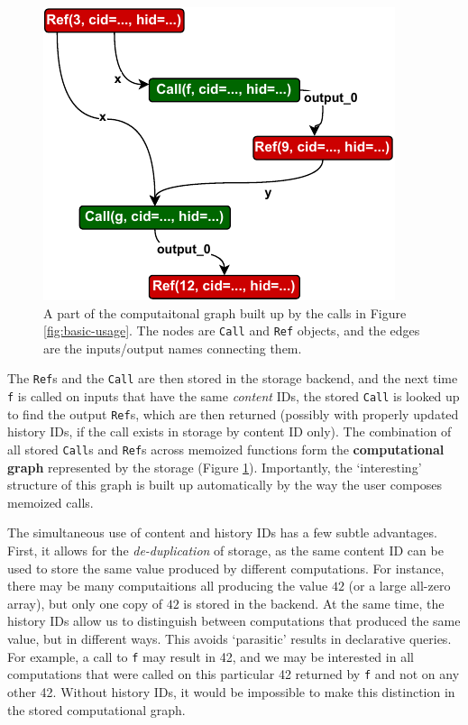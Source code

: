 \documentclass{article} %
\begin{document}
\begin{figure}
    \centering
    \includegraphics[width=\linewidth]{img/comp-graph.pdf}
    \caption{A part of the computaitonal graph built up by the calls in Figure
    \ref{fig:basic-usage}. The nodes are \texttt{Call} and \texttt{Ref} objects,
    and the edges are the inputs/output names connecting them.}
    \label{fig:comp-graph}
\end{figure}


The \texttt{Ref}s and the \texttt{Call} are then stored in the storage backend,
and the next time \texttt{f} is called on inputs that have the same
\emph{content} IDs, the stored \texttt{Call} is looked up to find the output
\texttt{Ref}s, which are then returned (possibly with properly updated history
IDs, if the call exists in storage by content ID only). The combination of all
stored \texttt{Call}s and \texttt{Ref}s across memoized functions form the
\textbf{computational graph} represented by the storage (Figure \ref{fig:comp-graph}). Importantly, the
`interesting' structure of this graph is built up automatically by the way the
user composes memoized calls.


The simultaneous use of content and history IDs has a few subtle advantages.
First, it allows for the \emph{de-duplication} of storage, as the same content
ID can be used to store the same value produced by different computations. For
instance, there may be many computaitions all producing the value $42$ (or a
large all-zero array), but only one copy of $42$ is stored in the backend. At
the same time, the history IDs allow us to distinguish between computations that
produced the same value, but in different ways. This avoids `parasitic' results
in declarative queries. For example, a call to \texttt{f} may result in 42, and
we may be interested in all computations that were called on this particular 42
returned by \texttt{f} and not on any other 42. Without history IDs, it would be
impossible to make this distinction in the stored computational graph.
\end{document}
